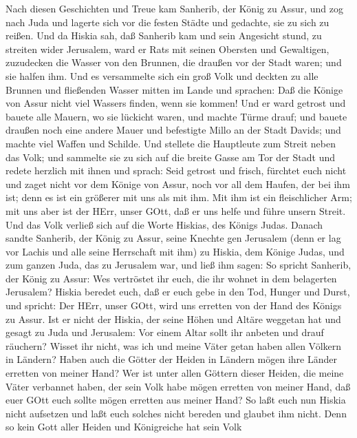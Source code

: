  Nach diesen Geschichten und Treue kam Sanherib, der König
zu Assur, und zog nach Juda und lagerte sich vor die festen Städte und
gedachte, sie zu sich zu reißen.  Und da Hiskia sah, daß
Sanherib kam und sein Angesicht stund, zu streiten wider Jerusalem,
 ward er Rats mit seinen Obersten und Gewaltigen, zuzudecken
die Wasser von den Brunnen, die draußen vor der Stadt waren; und sie
halfen ihm.  Und es versammelte sich ein groß Volk und
deckten zu alle Brunnen und fließenden Wasser mitten im Lande und
sprachen: Daß die Könige von Assur nicht viel Wassers finden, wenn sie
kommen!  Und er ward getrost und bauete alle Mauern, wo sie
lückicht waren, und machte Türme drauf; und bauete draußen noch eine
andere Mauer und befestigte Millo an der Stadt Davids; und machte viel
Waffen und Schilde.  Und stellete die Hauptleute zum Streit
neben das Volk; und sammelte sie zu sich auf die breite Gasse am Tor der
Stadt und redete herzlich mit ihnen und sprach:  Seid
getrost und frisch, fürchtet euch nicht und zaget nicht vor dem Könige
von Assur, noch vor all dem Haufen, der bei ihm ist; denn es ist ein
größerer mit uns als mit ihm.  Mit ihm ist ein fleischlicher
Arm; mit uns aber ist der HErr, unser GOtt, daß er uns helfe und führe
unsern Streit. Und das Volk verließ sich auf die Worte Hiskias, des
Königs Judas.  Danach sandte Sanherib, der König zu Assur,
seine Knechte gen Jerusalem (denn er lag vor Lachis und alle seine
Herrschaft mit ihm) zu Hiskia, dem Könige Judas, und zum ganzen Juda,
das zu Jerusalem war, und ließ ihm sagen:  So spricht
Sanherib, der König zu Assur: Wes vertröstet ihr euch, die ihr wohnet in
dem belagerten Jerusalem?  Hiskia beredet euch, daß er euch
gebe in den Tod, Hunger und Durst, und spricht: Der HErr, unser GOtt,
wird uns erretten von der Hand des Königs zu Assur.  Ist er
nicht der Hiskia, der seine Höhen und Altäre weggetan hat und gesagt zu
Juda und Jerusalem: Vor einem Altar sollt ihr anbeten und drauf
räuchern?  Wisset ihr nicht, was ich und meine Väter getan
haben allen Völkern in Ländern? Haben auch die Götter der Heiden in
Ländern mögen ihre Länder erretten von meiner Hand?  Wer
ist unter allen Göttern dieser Heiden, die meine Väter verbannet haben,
der sein Volk habe mögen erretten von meiner Hand, daß euer GOtt euch
sollte mögen erretten aus meiner Hand?  So laßt euch nun
Hiskia nicht aufsetzen und laßt euch solches nicht bereden und glaubet
ihm nicht. Denn so kein Gott aller Heiden und Königreiche hat sein Volk
